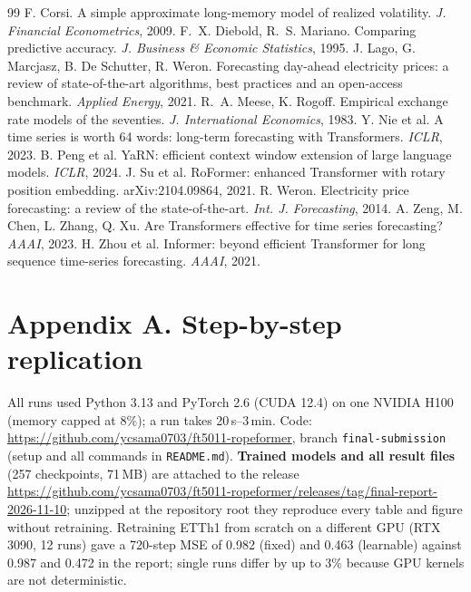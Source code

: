 \documentclass[12pt]{article}
\begin{document}
\begingroup\footnotesize
\begin{thebibliography}{99}\setlength{\itemsep}{0pt}\setlength{\parskip}{0pt}
 F. Corsi. A simple approximate long-memory model of realized volatility. \emph{J. Financial Econometrics}, 2009.
 F.~X. Diebold, R.~S. Mariano. Comparing predictive accuracy. \emph{J. Business \& Economic Statistics}, 1995.
 J. Lago, G. Marcjasz, B. De Schutter, R. Weron. Forecasting day-ahead electricity prices: a review of state-of-the-art algorithms, best practices and an open-access benchmark. \emph{Applied Energy}, 2021.
 R.~A. Meese, K. Rogoff. Empirical exchange rate models of the seventies. \emph{J. International Economics}, 1983.
 Y. Nie et al. A time series is worth 64 words: long-term forecasting with Transformers. \emph{ICLR}, 2023.
 B. Peng et al. YaRN: efficient context window extension of large language models. \emph{ICLR}, 2024.
 J. Su et al. RoFormer: enhanced Transformer with rotary position embedding. arXiv:2104.09864, 2021.
 R. Weron. Electricity price forecasting: a review of the state-of-the-art. \emph{Int. J. Forecasting}, 2014.
 A. Zeng, M. Chen, L. Zhang, Q. Xu. Are Transformers effective for time series forecasting? \emph{AAAI}, 2023.
 H. Zhou et al. Informer: beyond efficient Transformer for long sequence time-series forecasting. \emph{AAAI}, 2021.
\end{thebibliography}
\endgroup

\clearpage
\appendix\small
\section*{Appendix A. Step-by-step replication}
All runs used Python 3.13 and PyTorch 2.6 (CUDA 12.4) on one NVIDIA H100 (memory capped at 8\%); a run takes 20\,s--3\,min.
Code: \url{https://github.com/ycsama0703/ft5011-ropeformer}, branch \texttt{final-submission} (setup and all commands in \texttt{README.md}).
\textbf{Trained models and all result files} (257 checkpoints, 71\,MB) are attached to the release \url{https://github.com/ycsama0703/ft5011-ropeformer/releases/tag/final-report-2026-11-10}; unzipped at the repository root they reproduce every table and figure without retraining. Retraining ETTh1 from scratch on a different GPU (RTX 3090, 12 runs) gave a 720-step MSE of 0.982 (fixed) and 0.463 (learnable) against 0.987 and 0.472 in the report; single runs differ by up to 3\% because GPU kernels are not deterministic.
\end{document}
